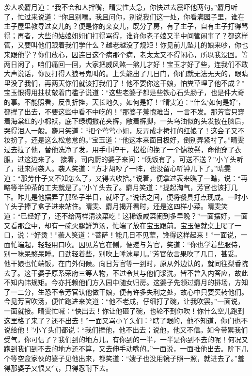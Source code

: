 \documentclass[12pt,oneside]{book}
\begin{document}
袭人唤麝月道：“我不会和人拌嘴，晴雯性太急，你快过去震吓他两句。”麝月听了，忙过来说道：“你且别嚷。我且问你，别说我们这一处，你看满园子里，谁在主子屋里教导过女儿的？便是你的亲女儿，既分了房，有了主子，自有主子打得骂得；再者，大些的姑娘姐姐们打得骂得，谁许你老子娘又半中间管闲事了？都这样管，又要叫他们跟着我们学什么？越老越没了规矩！你见前儿坠儿的娘来吵，你也来跟他学？你们放心，因连日这个病那个病，老太太又不得闲心，所以我没回。等两日闲了，咱们痛回一回，大家把威风煞一煞儿才好！宝玉才好了些，连我们不敢大声说话，你反打得人狼号鬼叫的。上头能出了几日门，你们就无法无天的，眼睛里没了我们，再两天你们就该打我们了！他不要你这干娘，怕粪草埋了他不成？”
宝玉恨得用拄杖敲着门槛子说道：“这些老婆子都是些铁心石头肠子，也是件大奇的事。不能照看，反倒折挫，天长地久，如何是好！”晴雯道：“什么‘如何是好’，都撵了出去，不要这些中看不中吃的！”那婆子羞愧难当，一言不发。那芳官只穿着海棠红的小棉袄，底下绿绸撒花夹裤，敞着裤脚，一头乌油似的头发披在脑后，哭得泪人一般。麝月笑道：“把个莺莺小姐，反弄成才拷打的红娘了！这会子又不妆扮了，还是这么松怠怠的。”宝玉道：“他这本来面目极好，倒别弄紧衬了。”晴雯过去拉了他，替他洗净了发，用手巾拧干，松松的挽了一个慵妆髻，命他穿了衣服，过这边来了。
接着，司内厨的婆子来问：“晚饭有了，可送不送？”小丫头听了，进来问袭人。袭人笑道：“方才胡吵了一阵，也没留心听钟几下了。”晴雯道：“那劳什子又不知怎么了，又得去收拾。”说着，便拿过表来瞧了一瞧，说：“再略等半钟茶的工夫就是了。”小丫头去了。麝月笑道：“提起淘气，芳官也该打几下。昨儿是他摆弄了那坠子半日，就坏了。”说话之间，便将餐具打点现成。一时小丫头子捧了盒子进来站住。晴雯、麝月揭开看时，还是这四样小菜。晴雯笑道：“已经好了，还不给两样清淡菜吃！这稀饭咸菜闹到多早晚？”一面摆好，一面又看那盒中，却有一碗火腿鲜笋汤，忙端了放在宝玉跟前。宝玉便就桌上喝了一口，说：“好烫！”袭人笑道：“菩萨！能几日不见荤，馋得这样起来！”一面说，一面忙端起，轻轻用口吹。因见芳官在侧，便递与芳官，笑道：“你也学着些服侍，别一味呆憨呆睡。口劲轻着些，别吹上唾沫星儿。”芳官依言果吹了几口，甚妥。
他干娘也忙端饭，在门外伺候。向日芳官等一到时，原从外边认的，就同往梨香院去了。这干婆子原系荣府三等人物，不过令其与他们浆洗，皆不曾入内答应，故此不知内帏规矩。今亦托赖他们方入园中随女归房。这婆子先领过麝月的排场，方知了一二分，生恐不令芳官认他做干娘，便有许多失利之处，故心中只要买转他们。今见芳官吹汤，便忙跑进来笑道：“他不老成，仔细打了碗，让我吹罢。”一面说，一面就接。晴雯忙喊：“快出去！你让他砸了碗，也轮不到你吹！你什么空儿跑到这里格子来了？还不出去！”一面又骂小丫头们：“瞎了眼的，他不知道，你们也不说给他！”小丫头们都说：“我们撵他，他不出去；说他，他又不信。如今带累我们受气，你可信了？我们到的地方儿，有你到的一半，一半是你到不去的呢！何况又跑到我们到不去的地方还不算，又去伸手动嘴的。”一面说，一面推他出去。阶下几个等空盒家伙的婆子见他出来，都笑道：“嫂子也没用镜子照一照，就进去了。”羞得那婆子又恨又气，只得忍耐下去。
\end{document}
